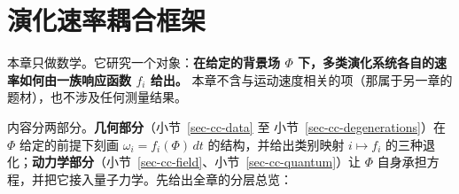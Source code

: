 \documentclass[
  chinese,
  a4paper,
  UTF8,
  12pt,
  oneside,
  openany]{ctexbook}
\theoremstyle{plain}
\theoremstyle{plain}
\theoremstyle{plain}
\theoremstyle{definition}
\theoremstyle{plain}
\theoremstyle{plain}
\theoremstyle{remark}
\begin{document}

\chapter{演化速率耦合框架}\label{sec-clock-coupling}

本章只做数学。它研究一个对象：\textbf{在给定的背景场 \(\Phi\)
下，多类演化系统各自的速率如何由一族响应函数 \(f_i\) 给出。}
本章不含与运动速度相关的项（那属于另一章的题材），也不涉及任何测量结果。

内容分两部分。\textbf{几何部分}（小节~\ref{sec-cc-data} 至
小节~\ref{sec-cc-degenerations}）在 \(\Phi\) 给定的前提下刻画
\(\omega_i=f_i(\Phi)\,dt\) 的结构，并给出类别映射 \(i\mapsto f_i\)
的三种退化；\textbf{动力学部分}（小节~\ref{sec-cc-field}、小节~\ref{sec-cc-quantum}）让
\(\Phi\) 自身承担方程，并把它接入量子力学。先给出全章的分层总览：
\end{document}
